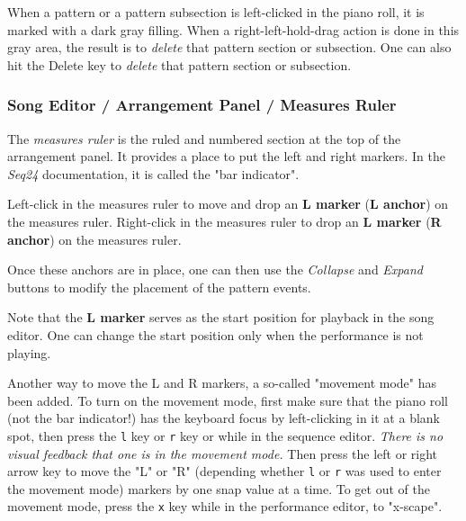    When a pattern or a pattern subsection is left-clicked in the piano
   roll, it is marked with a dark gray filling.
   When a right-left-hold-drag action is done in this gray area, the result
   is to \textsl{delete} that pattern section or subsection.
   One can also hit the Delete key to \textsl{delete} that pattern section
   or subsection.

\subsubsection{Song Editor / Arrangement Panel / Measures Ruler}
\label{subsubsec:seq64_song_editor_arrangement_panel_measures_ruler}

   The \textsl{measures ruler} is the ruled and numbered section at the top
   of the arrangement panel.  It provides a place to put the left and right
   markers.  In the \textsl{Seq24} documentation, it is called the "bar
   indicator".

   Left-click in the measures ruler to move and drop an
   \textbf{L marker} (\textbf{L anchor}) on the measures ruler.
   Right-click in the measures ruler to drop an
   \textbf{L marker} (\textbf{R anchor}) on the measures ruler.

   Once these anchors are in place, one can then use
	the \textsl{Collapse} and \textsl{Expand} buttons to modify the
   placement of the pattern events.

   Note that the \textbf{L marker} serves as the start position for playback
   in the song editor.  One can change the start position only when the
   performance is not playing.

   Another way to move the L and R markers, a so-called "movement mode"
   has been added.
   To turn on the movement mode, first make sure that the piano roll (not the
   bar indicator!) has the
   keyboard focus by left-clicking in it at a blank spot, then press the
   \texttt{l} key or
   \texttt{r} key or
   while in the sequence editor.
   \textsl{There is no visual feedback that one is in the movement mode.}
   Then press the left or right arrow key to move the "L" or "R" (depending
   whether \texttt{l} or \texttt{r} was used to enter the movement mode)
   markers by one snap value at a time.
   To get out of the movement mode, press the
   \texttt{x} key while in the performance editor, to "x-scape".

